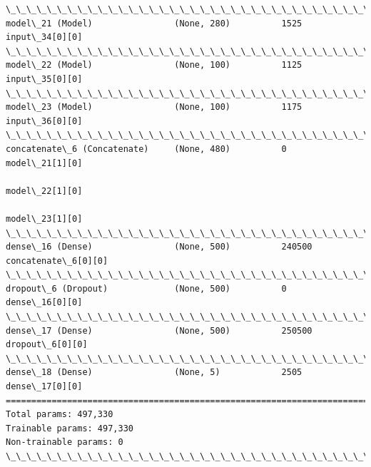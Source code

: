 \documentclass[11pt]{article}
\begin{document}
\begin{Verbatim}[commandchars=\\\{\}]
\_\_\_\_\_\_\_\_\_\_\_\_\_\_\_\_\_\_\_\_\_\_\_\_\_\_\_\_\_\_\_\_\_\_\_\_\_\_\_\_\_\_\_\_\_\_\_\_\_\_\_\_\_\_\_\_\_\_\_\_\_\_\_\_\_\_\_\_\_\_\_\_\_\_\_\_\_\_\_\_\_\_\_\_\_\_\_\_\_\_\_\_\_\_\_\_\_\_
model\_21 (Model)                (None, 280)          1525        input\_34[0][0]                   
\_\_\_\_\_\_\_\_\_\_\_\_\_\_\_\_\_\_\_\_\_\_\_\_\_\_\_\_\_\_\_\_\_\_\_\_\_\_\_\_\_\_\_\_\_\_\_\_\_\_\_\_\_\_\_\_\_\_\_\_\_\_\_\_\_\_\_\_\_\_\_\_\_\_\_\_\_\_\_\_\_\_\_\_\_\_\_\_\_\_\_\_\_\_\_\_\_\_
model\_22 (Model)                (None, 100)          1125        input\_35[0][0]                   
\_\_\_\_\_\_\_\_\_\_\_\_\_\_\_\_\_\_\_\_\_\_\_\_\_\_\_\_\_\_\_\_\_\_\_\_\_\_\_\_\_\_\_\_\_\_\_\_\_\_\_\_\_\_\_\_\_\_\_\_\_\_\_\_\_\_\_\_\_\_\_\_\_\_\_\_\_\_\_\_\_\_\_\_\_\_\_\_\_\_\_\_\_\_\_\_\_\_
model\_23 (Model)                (None, 100)          1175        input\_36[0][0]                   
\_\_\_\_\_\_\_\_\_\_\_\_\_\_\_\_\_\_\_\_\_\_\_\_\_\_\_\_\_\_\_\_\_\_\_\_\_\_\_\_\_\_\_\_\_\_\_\_\_\_\_\_\_\_\_\_\_\_\_\_\_\_\_\_\_\_\_\_\_\_\_\_\_\_\_\_\_\_\_\_\_\_\_\_\_\_\_\_\_\_\_\_\_\_\_\_\_\_
concatenate\_6 (Concatenate)     (None, 480)          0           model\_21[1][0]                   
                                                                 model\_22[1][0]                   
                                                                 model\_23[1][0]                   
\_\_\_\_\_\_\_\_\_\_\_\_\_\_\_\_\_\_\_\_\_\_\_\_\_\_\_\_\_\_\_\_\_\_\_\_\_\_\_\_\_\_\_\_\_\_\_\_\_\_\_\_\_\_\_\_\_\_\_\_\_\_\_\_\_\_\_\_\_\_\_\_\_\_\_\_\_\_\_\_\_\_\_\_\_\_\_\_\_\_\_\_\_\_\_\_\_\_
dense\_16 (Dense)                (None, 500)          240500      concatenate\_6[0][0]              
\_\_\_\_\_\_\_\_\_\_\_\_\_\_\_\_\_\_\_\_\_\_\_\_\_\_\_\_\_\_\_\_\_\_\_\_\_\_\_\_\_\_\_\_\_\_\_\_\_\_\_\_\_\_\_\_\_\_\_\_\_\_\_\_\_\_\_\_\_\_\_\_\_\_\_\_\_\_\_\_\_\_\_\_\_\_\_\_\_\_\_\_\_\_\_\_\_\_
dropout\_6 (Dropout)             (None, 500)          0           dense\_16[0][0]                   
\_\_\_\_\_\_\_\_\_\_\_\_\_\_\_\_\_\_\_\_\_\_\_\_\_\_\_\_\_\_\_\_\_\_\_\_\_\_\_\_\_\_\_\_\_\_\_\_\_\_\_\_\_\_\_\_\_\_\_\_\_\_\_\_\_\_\_\_\_\_\_\_\_\_\_\_\_\_\_\_\_\_\_\_\_\_\_\_\_\_\_\_\_\_\_\_\_\_
dense\_17 (Dense)                (None, 500)          250500      dropout\_6[0][0]                  
\_\_\_\_\_\_\_\_\_\_\_\_\_\_\_\_\_\_\_\_\_\_\_\_\_\_\_\_\_\_\_\_\_\_\_\_\_\_\_\_\_\_\_\_\_\_\_\_\_\_\_\_\_\_\_\_\_\_\_\_\_\_\_\_\_\_\_\_\_\_\_\_\_\_\_\_\_\_\_\_\_\_\_\_\_\_\_\_\_\_\_\_\_\_\_\_\_\_
dense\_18 (Dense)                (None, 5)            2505        dense\_17[0][0]                   
==================================================================================================
Total params: 497,330
Trainable params: 497,330
Non-trainable params: 0
\_\_\_\_\_\_\_\_\_\_\_\_\_\_\_\_\_\_\_\_\_\_\_\_\_\_\_\_\_\_\_\_\_\_\_\_\_\_\_\_\_\_\_\_\_\_\_\_\_\_\_\_\_\_\_\_\_\_\_\_\_\_\_\_\_\_\_\_\_\_\_\_\_\_\_\_\_\_\_\_\_\_\_\_\_\_\_\_\_\_\_\_\_\_\_\_\_\_

    \end{Verbatim}
\end{document}
